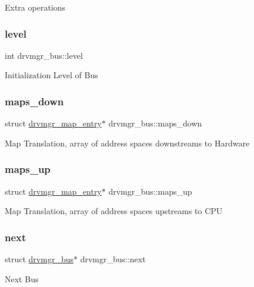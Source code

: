 Extra operations \mbox{\label{structdrvmgr__bus_aac06ed42936fd2af9086e200fa2ec86d}} 
\subsubsection{\texorpdfstring{level}{level}}
{\footnotesize\ttfamily int drvmgr\+\_\+bus\+::level}

Initialization Level of Bus \mbox{\label{structdrvmgr__bus_a55f02fb830efad84b593618f042ca702}} 
\subsubsection{\texorpdfstring{maps\_down}{maps\_down}}
{\footnotesize\ttfamily struct \mbox{\hyperlink{structdrvmgr__map__entry}{drvmgr\+\_\+map\+\_\+entry}}$\ast$ drvmgr\+\_\+bus\+::maps\+\_\+down}

Map Translation, array of address spaces downstreams to Hardware \mbox{\label{structdrvmgr__bus_aa8a21e55bfae1ccaec41f20809d0f68d}} 
\subsubsection{\texorpdfstring{maps\_up}{maps\_up}}
{\footnotesize\ttfamily struct \mbox{\hyperlink{structdrvmgr__map__entry}{drvmgr\+\_\+map\+\_\+entry}}$\ast$ drvmgr\+\_\+bus\+::maps\+\_\+up}

Map Translation, array of address spaces upstreams to C\+PU \mbox{\label{structdrvmgr__bus_a86229ae3082803255914a6e9facaff01}} 
\subsubsection{\texorpdfstring{next}{next}}
{\footnotesize\ttfamily struct \mbox{\hyperlink{structdrvmgr__bus}{drvmgr\+\_\+bus}}$\ast$ drvmgr\+\_\+bus\+::next}

Next Bus \mbox{\label{structdrvmgr__bus_a37a26b8023b60dd1ca46a158a9caa90a}} 
